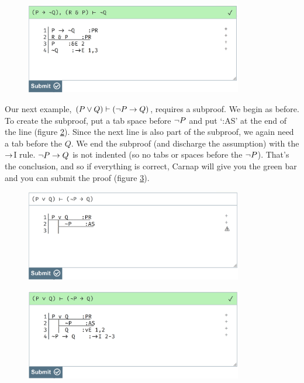 \begin{figure}[h]
\includegraphics[width=9.5cm]{textbook--1c.PNG}
\caption{}
\label{fig:proof-1c}
\end{figure}

Our next example, $(P \vee Q) \vdash ({\neg} P \rightarrow Q)$, requires a subproof. We begin as before. To create the subproof, put a tab space before ${\neg} P$ and put `:AS' at the end of the line (figure \ref{fig:proof-2a}). Since the next line is also part of the subproof, we again need a tab before the $Q$. We end the subproof (and discharge the assumption) with the $\rightarrow$I rule. ${\neg} P \rightarrow Q$ is not indented (so no tabs or spaces before the ${\neg} P$). That's the conclusion, and so if everything is correct, Carnap will give you the green bar and you can submit the proof (figure \ref{fig:proof-2b}). 

\begin{figure}[h]
\includegraphics[width=9.5cm]{textbook--2a.PNG}
\caption{}
\label{fig:proof-2a}
\end{figure}

\begin{figure}[h]
\includegraphics[width=9.5cm]{textbook--2b.PNG}
\caption{}
\label{fig:proof-2b}
\end{figure}

